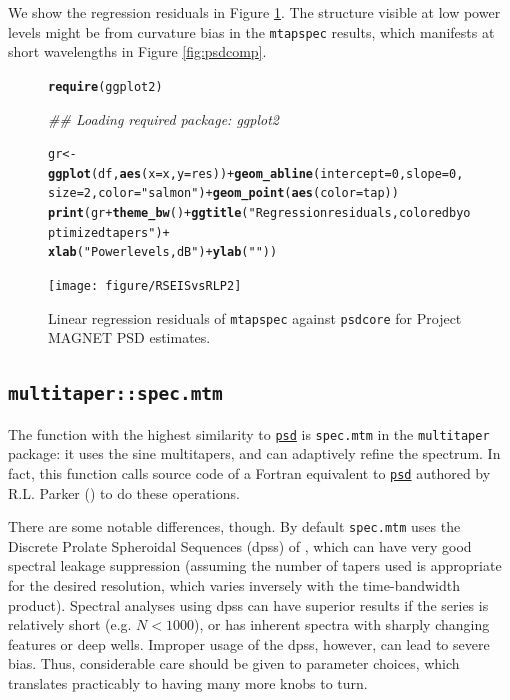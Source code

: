 \documentclass{article}\usepackage{graphicx, color}
\makeatletter
\newcommand{\hlfunctioncall}[1]{\textcolor[rgb]{0.501960784313725,0,0.329411764705882}{\textbf{#1}}}%
\newcommand{\hlstring}[1]{\textcolor[rgb]{0.6,0.6,1}{#1}}%
\newenvironment{kframe}{%
 \def\at@end@of@kframe{}%
 \ifinner\ifhmode%
  \def\at@end@of@kframe{\end{minipage}}%
  \begin{minipage}{\columnwidth}%
 \fi\fi%
 \def\FrameCommand##1{\hskip\@totalleftmargin \hskip-\fboxsep
 \colorbox{shadecolor}{##1}\hskip-\fboxsep
     \hskip-\linewidth \hskip-\@totalleftmargin \hskip\columnwidth}%
 \MakeFramed {\advance\hsize-\width
   \@totalleftmargin\z@ \linewidth\hsize
   \@setminipage}}%
 {\par\unskip\endMakeFramed%
 \at@end@of@kframe}
\newenvironment{knitrout}{}{} %
\newcommand{\Rcmd}[1]{\texttt{#1}}
\newcommand{\psd}[0]{\href{http://abarbour.github.com/psd/}{\color{blue}\Rcmd{psd}}}
\makeatother
\begin{document}
We show the regression residuals in Figure \ref{fig:psdreg}.  
The structure visible
at low power levels might be from curvature bias in
the \Rcmd{mtapspec} results, which
manifests at short wavelengths
in Figure \ref{fig:psdcomp}.

\begin{figure}[htb!]
\begin{center}
\begin{knitrout}
\color{fgcolor}\begin{kframe}
\begin{alltt}
\hlfunctioncall{require}(ggplot2)
\end{alltt}


{\ttfamily\noindent\itshape\textcolor{messagecolor}{\#\# Loading required package: ggplot2}}\begin{alltt}
gr <- \hlfunctioncall{ggplot}(df, \hlfunctioncall{aes}(x = x, y = res)) + \hlfunctioncall{geom_abline}(intercept = 0, slope = 0, 
    size = 2, color = \hlstring{"salmon"}) + \hlfunctioncall{geom_point}(\hlfunctioncall{aes}(color = tap))
\hlfunctioncall{print}(gr + \hlfunctioncall{theme_bw}() + \hlfunctioncall{ggtitle}(\hlstring{"Regression residuals, colored by optimized tapers"}) + 
    \hlfunctioncall{xlab}(\hlstring{"Power levels, dB"}) + \hlfunctioncall{ylab}(\hlstring{""}))
\end{alltt}
\end{kframe}
\texttt{[image: figure/RSEISvsRLP2]} 

\end{knitrout}

\caption{Linear regression residuals of
\Rcmd{mtapspec} against \Rcmd{psdcore} for Project MAGNET PSD estimates.}
\label{fig:psdreg}
\end{center}
\end{figure}

\subsection{\Rcmd{multitaper::spec.mtm}}
The function with the highest similarity to \psd{} is
\Rcmd{spec.mtm} in the \Rcmd{multitaper} package: it uses
the sine multitapers, and can adaptively refine the spectrum.
In fact, this function
calls source code of a Fortran equivalent to \psd{}
authored by R.L. Parker (\citeyear{parkerweb}) to do these operations.

There are some notable differences, though.  
By default \Rcmd{spec.mtm}
 uses the Discrete Prolate Spheroidal Sequences (dpss) 
of \citet{thomson1982},
which can have very good spectral leakage suppression (assuming
the number of tapers used is appropriate for the 
desired resolution, which varies inversely with the time-bandwidth product).
Spectral analyses using dpss can have superior results if the series is
relatively short (e.g. $N < 1000$), or has inherent spectra
with sharply changing features or
deep wells.
Improper usage of the dpss, however, can lead to severe bias.
Thus, considerable care should be given to parameter choices, 
which translates practicably
to having many more knobs to turn.
\end{document}
